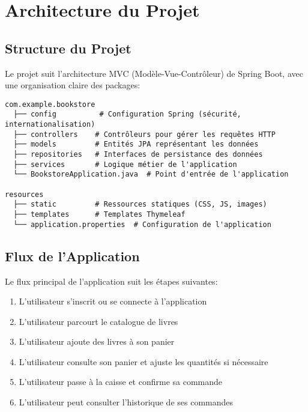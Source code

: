 \documentclass[12pt,a4paper]{report}
\begin{document}
\chapter{Architecture du Projet}

\section{Structure du Projet}
Le projet suit l'architecture MVC (Modèle-Vue-Contrôleur) de Spring Boot, avec une organisation claire des packages:

\begin{tcolorbox}[colback=gray!5,colframe=gray!75!black,title=Structure des Packages]
\begin{verbatim}
com.example.bookstore
  ├── config          # Configuration Spring (sécurité, internationalisation)
  ├── controllers    # Contrôleurs pour gérer les requêtes HTTP
  ├── models         # Entités JPA représentant les données
  ├── repositories   # Interfaces de persistance des données
  ├── services       # Logique métier de l'application
  └── BookstoreApplication.java  # Point d'entrée de l'application

resources
  ├── static         # Ressources statiques (CSS, JS, images)
  ├── templates      # Templates Thymeleaf
  └── application.properties  # Configuration de l'application
\end{verbatim}
\end{tcolorbox}

\section{Flux de l'Application}
Le flux principal de l'application suit les étapes suivantes:

\begin{enumerate}
    \item L'utilisateur s'inscrit ou se connecte à l'application
    \item L'utilisateur parcourt le catalogue de livres
    \item L'utilisateur ajoute des livres à son panier
    \item L'utilisateur consulte son panier et ajuste les quantités si nécessaire
    \item L'utilisateur passe à la caisse et confirme sa commande
    \item L'utilisateur peut consulter l'historique de ses commandes
\end{enumerate}
\end{document}
